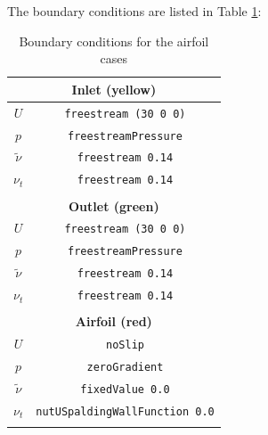     \newpage
    
    The boundary conditions are listed in Table \ref{table:airfoilBC}:
   
        \begin{table}[h!]
        \centering
        \small
        \caption{Boundary conditions for the airfoil cases}
        \label{table:airfoilBC}
        \begin{tabular}{cc}
        \multicolumn{2}{c}{\textbf{Inlet (yellow)}}          \\
        \hline
        $U$                    & \texttt{freestream (30 0 0)}           \\
        $p$                     &  \texttt{freestreamPressure}          \\
        $\tilde{\nu}$                    & \texttt{freestream 0.14}           \\
        $\nu_t$                    & \texttt{freestream 0.14}           \\
                & \\

        \multicolumn{2}{c}{\textbf{Outlet (green)}}          \\
        \hline
        $U$                   & \texttt{freestream (30 0 0)}           \\
        $p$                     &  \texttt{freestreamPressure}          \\
        $\tilde{\nu}$                    & \texttt{freestream 0.14}           \\
        $\nu_t$                    & \texttt{freestream 0.14}           \\
        & \\

        \multicolumn{2}{c}{\textbf{Airfoil (red)}}           \\
        \hline
        $U$                    & \texttt{noSlip}           \\
        $p$                     &  \texttt{zeroGradient}          \\
        $\tilde{\nu}$                    & \texttt{fixedValue 0.0}           \\
        $\nu_t$                    & \texttt{nutUSpaldingWallFunction 0.0}           \\
        & \\


\end{tabular}
\end{table}

